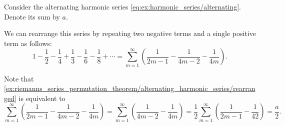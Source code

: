 \begin{example}\label{ex:riemanns_series_permutation_theorem/alternating_harmonic_series}
  Consider the alternating harmonic series \eqref{eq:ex:harmonic_series/alternating}. Denote its sum by \( a \).

  We can rearrange this series by repeating two negative terms and a single positive term as follows:
  \begin{equation}\label{ex:riemanns_series_permutation_theorem/alternating_harmonic_series/rearranged}
    1 - \frac 1 2 - \frac 1 4 + \frac 1 3 - \frac 1 6 - \frac 1 8 + \cdots
    =
    \sum_{m=1}^\infty \left( \frac 1 {2m - 1} - \frac 1 {4m - 2} - \frac 1 {4m} \right).
  \end{equation}

  Note that \cref{ex:riemanns_series_permutation_theorem/alternating_harmonic_series/rearranged} is equivalent to
  \begin{equation*}
    \sum_{m=1}^\infty \left( \frac 1 {2m - 1} - \frac 1 {4m - 2} - \frac 1 {4m} \right)
    =
    \sum_{m=1}^\infty \left( \frac 1 {4m - 2} - \frac 1 {4m} \right)
    =
    \frac 1 2 \sum_{m=1}^\infty \left( \frac 1 {2m - 1} - \frac 1 {42} \right)
    =
    \frac a 2.
  \end{equation*}
\end{example}

